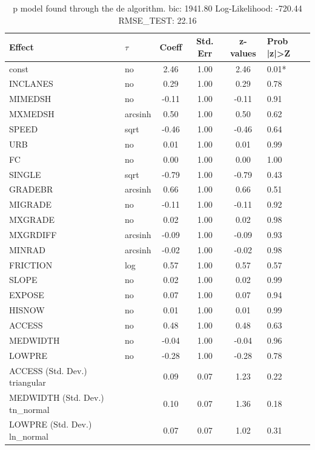 \begin{table}
	\caption{p model found through the de algorithm. bic: 1941.80 Log-Likelihood: -720.44 RMSE_TEST: 22.16}
	\begin{center}
		\begin{tabular}{|l|l|c|c|c|l|}
			\hline
			Effect & $\tau$ & Coeff & Std. Err & z-values & Prob |z|>Z \\
			\hline
			const & no & 2.46 & 1.00 & 2.46 & 0.01* \\
			\hline
			INCLANES & no & 0.29 & 1.00 & 0.29 & 0.78 \\
			\hline
			MIMEDSH & no & -0.11 & 1.00 & -0.11 & 0.91 \\
			\hline
			MXMEDSH & arcsinh & 0.50 & 1.00 & 0.50 & 0.62 \\
			\hline
			SPEED & sqrt & -0.46 & 1.00 & -0.46 & 0.64 \\
			\hline
			URB & no & 0.01 & 1.00 & 0.01 & 0.99 \\
			\hline
			FC & no & 0.00 & 1.00 & 0.00 & 1.00 \\
			\hline
			SINGLE & sqrt & -0.79 & 1.00 & -0.79 & 0.43 \\
			\hline
			GRADEBR & arcsinh & 0.66 & 1.00 & 0.66 & 0.51 \\
			\hline
			MIGRADE & no & -0.11 & 1.00 & -0.11 & 0.92 \\
			\hline
			MXGRADE & no & 0.02 & 1.00 & 0.02 & 0.98 \\
			\hline
			MXGRDIFF & arcsinh & -0.09 & 1.00 & -0.09 & 0.93 \\
			\hline
			MINRAD & arcsinh & -0.02 & 1.00 & -0.02 & 0.98 \\
			\hline
			FRICTION & log & 0.57 & 1.00 & 0.57 & 0.57 \\
			\hline
			SLOPE & no & 0.02 & 1.00 & 0.02 & 0.99 \\
			\hline
			EXPOSE & no & 0.07 & 1.00 & 0.07 & 0.94 \\
			\hline
			HISNOW & no & 0.01 & 1.00 & 0.01 & 0.99 \\
			\hline
			ACCESS & no & 0.48 & 1.00 & 0.48 & 0.63 \\
			\hline
			MEDWIDTH & no & -0.04 & 1.00 & -0.04 & 0.96 \\
			\hline
			LOWPRE & no & -0.28 & 1.00 & -0.28 & 0.78 \\
			\hline
			ACCESS (Std. Dev.) triangular &  & 0.09 & 0.07 & 1.23 & 0.22 \\
			\hline
			MEDWIDTH (Std. Dev.) tn_normal &  & 0.10 & 0.07 & 1.36 & 0.18 \\
			\hline
			LOWPRE (Std. Dev.) ln_normal &  & 0.07 & 0.07 & 1.02 & 0.31 \\
			\hline
		\end{tabular}
	\end{center}
\end{table}